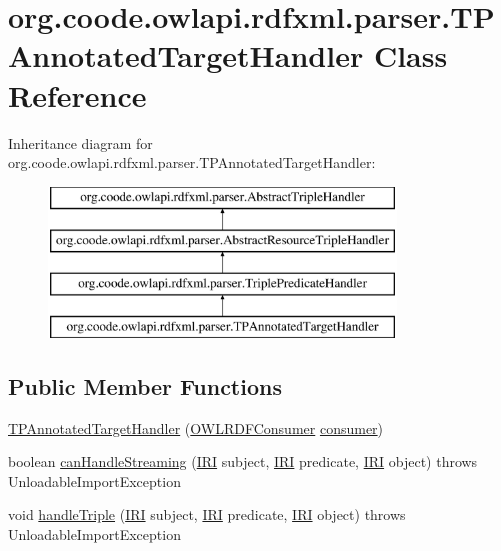 \hypertarget{classorg_1_1coode_1_1owlapi_1_1rdfxml_1_1parser_1_1_t_p_annotated_target_handler}{\section{org.\-coode.\-owlapi.\-rdfxml.\-parser.\-T\-P\-Annotated\-Target\-Handler Class Reference}
\label{classorg_1_1coode_1_1owlapi_1_1rdfxml_1_1parser_1_1_t_p_annotated_target_handler}
}
Inheritance diagram for org.\-coode.\-owlapi.\-rdfxml.\-parser.\-T\-P\-Annotated\-Target\-Handler\-:\begin{figure}[H]
\begin{center}
\leavevmode
\includegraphics[height=4.000000cm]{classorg_1_1coode_1_1owlapi_1_1rdfxml_1_1parser_1_1_t_p_annotated_target_handler}
\end{center}
\end{figure}
\subsection*{Public Member Functions}
\begin{DoxyCompactItemize}
\item 
\hyperlink{classorg_1_1coode_1_1owlapi_1_1rdfxml_1_1parser_1_1_t_p_annotated_target_handler_a7f7411bfc1ab1219512b7446286e0b1e}{T\-P\-Annotated\-Target\-Handler} (\hyperlink{classorg_1_1coode_1_1owlapi_1_1rdfxml_1_1parser_1_1_o_w_l_r_d_f_consumer}{O\-W\-L\-R\-D\-F\-Consumer} \hyperlink{classorg_1_1coode_1_1owlapi_1_1rdfxml_1_1parser_1_1_abstract_triple_handler_a4ccf4d898ff01eb1cadfa04b23d54e9c}{consumer})
\item 
boolean \hyperlink{classorg_1_1coode_1_1owlapi_1_1rdfxml_1_1parser_1_1_t_p_annotated_target_handler_ad6c1919c1535f53cf9cc59bebdc0548a}{can\-Handle\-Streaming} (\hyperlink{classorg_1_1semanticweb_1_1owlapi_1_1model_1_1_i_r_i}{I\-R\-I} subject, \hyperlink{classorg_1_1semanticweb_1_1owlapi_1_1model_1_1_i_r_i}{I\-R\-I} predicate, \hyperlink{classorg_1_1semanticweb_1_1owlapi_1_1model_1_1_i_r_i}{I\-R\-I} object)  throws Unloadable\-Import\-Exception 
\item 
void \hyperlink{classorg_1_1coode_1_1owlapi_1_1rdfxml_1_1parser_1_1_t_p_annotated_target_handler_a10f13984be16c4b78968906f30507575}{handle\-Triple} (\hyperlink{classorg_1_1semanticweb_1_1owlapi_1_1model_1_1_i_r_i}{I\-R\-I} subject, \hyperlink{classorg_1_1semanticweb_1_1owlapi_1_1model_1_1_i_r_i}{I\-R\-I} predicate, \hyperlink{classorg_1_1semanticweb_1_1owlapi_1_1model_1_1_i_r_i}{I\-R\-I} object)  throws Unloadable\-Import\-Exception 
\end{DoxyCompactItemize}
